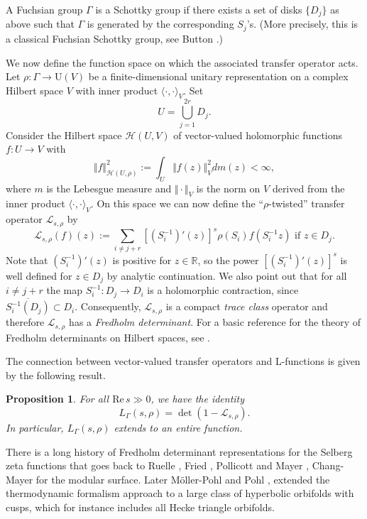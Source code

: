 \documentclass[12pt]{article}
\newtheorem{prop}[thm]{Proposition}
\newcommand{\R}{\mathrm{Re}\,}
\begin{document}
A Fuchsian group $ \Gamma $ is a Schottky group if there exists a set of disks $ \{ D_{j} \} $ as above such that $ \Gamma $ is generated by the corresponding $ S_{j} $'s. (More precisely, this is a classical Fuchsian Schottky group, see Button \cite{Button}.) 

We now define the function space on which the associated transfer operator acts. Let $ \rho : \Gamma \to \mathrm{U}(V) $ be a finite-dimensional unitary representation on a complex Hilbert space $ V $ with inner product $ \langle\cdot, \cdot\rangle_{V} $.
Set
$$ U = \bigcup_{j=1}^{2r} D_{j}. $$
Consider the Hilbert space $ \mathcal{H}(U, V) $ of vector-valued holomorphic functions $ f : U \to V $ with
$$ \Vert f\Vert^{2}_{\mathcal{H}(U, \rho)} := \int_{U} \Vert f(z)\Vert_{V}^{2} dm(z) < \infty,  $$ 
where $ m $ is the Lebesgue measure and $ \Vert \cdot\Vert_{V} $ is the norm on $ V $ derived from the inner product $ \langle \cdot, \cdot\rangle_{V} $. On this space we can now define the ``$\rho$-twisted'' transfer operator $ \mathcal{L}_{s,\rho} $ by
$$ \mathcal{L}_{s,\rho}(f)(z) := \sum_{i\neq j+r} \left[  (S_{i}^{-1})'(z) \right]^{s} \rho(S_{i})f(S_{i}^{-1}z) \text{ if } z\in D_{j}. $$
Note that $ (S_{i}^{-1})'(z) $ is positive for $ z\in \mathbb{R} $, so the power $ \left[  (S_{i}^{-1})'(z) \right]^{s} $ is well defined for $ z\in D_{j} $ by analytic continuation. We also point out that for all $ i\neq j+r $ the map $ S_{i}^{-1} : D_{j}\to D_{i} $ is a holomorphic contraction, since $ \overline{S_{i}^{-1}(D_{j})} \subset D_{i}. $ Consequently, $ \mathcal{L}_{s,\rho} $ is a compact \textit{trace class} operator and therefore $ \mathcal{L}_{s,\rho} $ has a \textit{Fredholm determinant}. For a basic reference for the theory of Fredholm determinants on Hilbert spaces, see \cite{Lidskii}.



The connection between vector-valued transfer operators and L-functions is given by the following result.

\begin{prop}\label{FredholIdentity} For all $ \R s \gg 0 $, we have the identity
$$ L_{\Gamma}(s, \rho) = \det(1-\mathcal{L}_{s,\rho}). $$
In particular, $ L_{\Gamma}(s,\rho) $ extends to an entire function.
\end{prop}
 

There is a long history of Fredholm determinant representations for the Selberg zeta functions that goes back to Ruelle  \cite{Ruelle}, Fried \cite{Fried}, Pollicott \cite{Pollicott} and Mayer \cite{Mayer}, Chang-Mayer \cite{ChangMayer} for the modular surface. Later M\"oller-Pohl \cite{Pohl2013} and Pohl \cite{Pohl2015}, \cite{Pohl2016} extended the thermodynamic formalism approach to a large class of hyperbolic orbifolds with cusps, which for instance includes all Hecke triangle orbifolds. 
\end{document}
